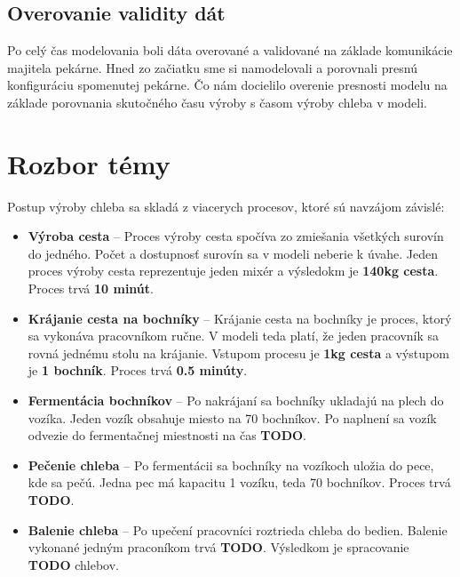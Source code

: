 \documentclass[a4paper, 10pt]{article}
\begin{document}
        \subsection{Overovanie validity dát}
            Po celý čas modelovania boli dáta overované a validované na základe komunikácie majitela pekárne. Hned zo
            začiatku sme si namodelovali a porovnali presnú konfiguráciu spomenutej pekárne. Čo nám docielilo overenie
            presnosti modelu na základe porovnania skutočného času výroby s časom výroby chleba v modeli.


    \section {Rozbor témy}
            Postup výroby chleba sa skladá z viacerych procesov, ktoré sú navzájom závislé:
            \begin{itemize}
                \item \textbf{Výroba cesta} -- Proces výroby cesta spočíva zo zmiešania všetkých surovín do jedného. Počet
                a dostupnosť surovín sa v modeli neberie k úvahe. Jeden proces výroby cesta reprezentuje jeden mixér a
                výsledokm je \textbf{140kg cesta}. Proces trvá \textbf{10 minút}.

                \item \textbf{Krájanie cesta na bochníky} -- Krájanie cesta na bochníky je proces, ktorý sa vykonáva pracovníkom
                ručne. V modeli teda platí, že jeden pracovník sa rovná jednému stolu na krájanie. Vstupom procesu je
                \textbf{1kg cesta} a výstupom je \textbf{1 bochník}. Proces trvá \textbf{0.5 minúty}.

                \item \textbf{Fermentácia bochníkov} -- Po nakrájaní sa bochníky ukladajú na plech do vozíka.
                Jeden vozík obsahuje miesto na 70 bochníkov. Po naplnení sa vozík odvezie do fermentačnej miestnosti
                na čas \textbf{TODO}.

                \item \textbf{Pečenie chleba} -- Po fermentácii sa bochníky na vozíkoch uložia do pece, kde sa pečú.
                Jedna pec má kapacitu 1 vozíku, teda 70 bochníkov. Proces trvá \textbf{TODO}.

                \item \textbf{Balenie chleba} -- Po upečení pracovníci roztrieda chleba do bedien. Balenie vykonané jedným
                praconíkom trvá \textbf{TODO}. Výsledkom je spracovanie \textbf{TODO} chlebov.
            \end{itemize}
\end{document}
